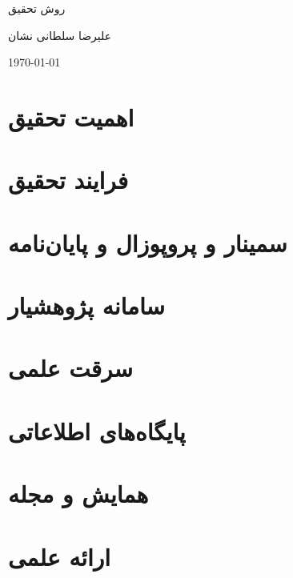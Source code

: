 \documentclass[20pt, a4paper]{article}
\begin{document}
\centerline{روش تحقیق}
\centerline{علیرضا سلطانی نشان}
\centerline{\today}
\tableofcontents

\section{اهمیت تحقیق}

\section{فرایند تحقیق}

\section{سمینار و پروپوزال و پایان‌نامه}

\section{سامانه پژوهشیار}

\section{سرقت علمی}

\section{پایگاه‌های اطلاعاتی}

\section{همایش و مجله}

\section{ارائه علمی}
\end{document}
